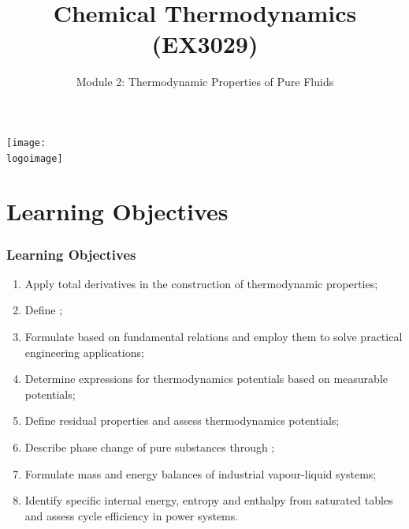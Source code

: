 \documentclass[10pt,compress,handout,unknownkeysallowed]{beamer}
\institute{School of Engineering}
\title{Chemical Thermodynamics (EX3029)}
\subtitle{Module 2: Thermodynamic Properties of Pure Fluids}
\date[ ]{ }
\newcommand{\logoimage}{../../FigBanner/UoAHorizBanner}
\begin{document}
\begin{frame}
  \titlepage
  \vfill%
  \begin{center}
    \texttt{[image: \\logoimage]}
  \end{center}
\end{frame}





\section{Learning Objectives}

\begin{frame}
 \frametitle{Learning Objectives}
   \begin{enumerate}
     \item<1-> Apply total derivatives in the construction of thermodynamic properties;
     \item<1-> Define ;
     \item<1-> Formulate  based on fundamental relations and employ them to solve practical engineering applications;
     \item<1-> Determine expressions for thermodynamics potentials based on measurable potentials;
     \item<1-> Define residual properties and assess thermodynamics potentials;
     \item<1-> Describe phase change of pure substances through ;
     \item<1-> Formulate mass and energy balances of industrial vapour-liquid systems;
     \item<1-> Identify specific internal energy, entropy and enthalpy from saturated tables and assess cycle efficiency in power systems.
   \end{enumerate}

\end{frame}
\end{document}
